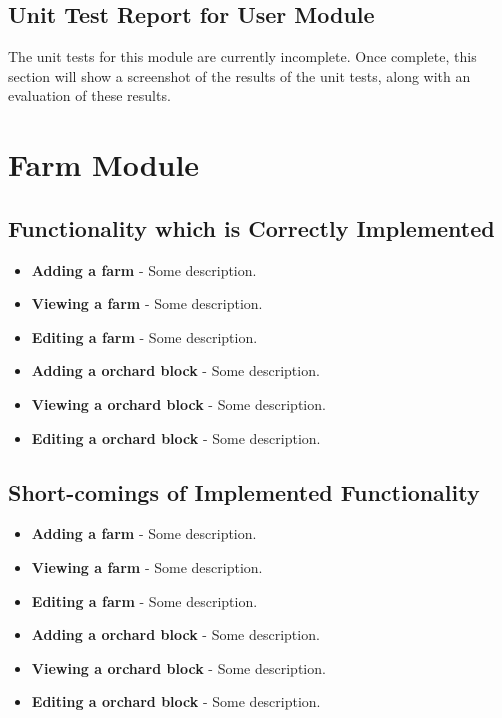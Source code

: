 \documentclass[11pt,fleqn]{book} %
\begin{document}
	\section{Unit Test Report for User Module}
		The unit tests for this module are currently incomplete. Once complete, this section will show a screenshot of the results of the unit tests, along with an evaluation of these results.


\chapter{Farm Module}
	\section{Functionality which is Correctly Implemented}
		\begin{itemize}
			\item\textbf{Adding a farm} -
			Some description. 
			
			\item\textbf{Viewing a farm} -
			Some description.
			
			\item\textbf{Editing a farm} -
			Some description.
			
			\item\textbf{Adding a orchard block} -
			Some description. 
			
			\item\textbf{Viewing a orchard block} -
			Some description.
			
			\item\textbf{Editing a orchard block} -
			Some description.
		\end{itemize}
	\section{Short-comings of Implemented Functionality}
		\begin{itemize}
			\item\textbf{Adding a farm} -
			Some description. 
			
			\item\textbf{Viewing a farm} -
			Some description.
			
			\item\textbf{Editing a farm} -
			Some description.
			
			\item\textbf{Adding a orchard block} -
			Some description. 
			
			\item\textbf{Viewing a orchard block} -
			Some description.
			
			\item\textbf{Editing a orchard block} -
			Some description.
		\end{itemize}
\end{document}
